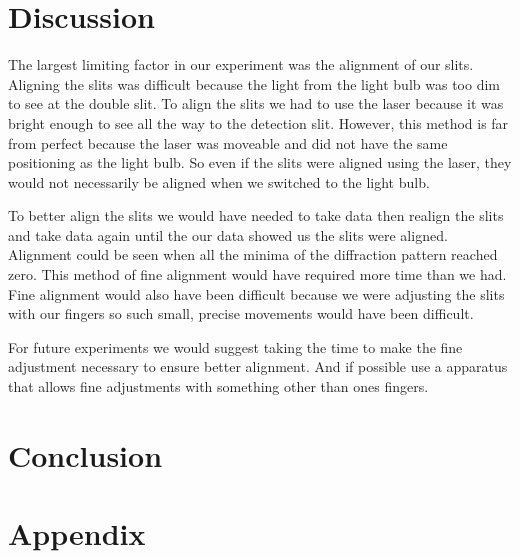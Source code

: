\documentclass[prb,preprint]{revtex4-1}
\begin{document}
\section{Discussion}

The largest limiting factor in our experiment was the alignment of our slits. Aligning the slits was difficult because the light from the light bulb was too dim to see at the double slit. To align the slits we had to use the laser because it was bright enough to see all the way to the detection slit. However, this method is far from perfect because the laser was moveable and did not have the same positioning as the light bulb. So even if the slits were aligned using the laser, they would not necessarily be aligned when we switched to the light bulb.

To better align the slits we would have needed to take data then realign the slits and take data again until the our data showed us the slits were aligned. Alignment could be seen when all the minima of the diffraction pattern reached zero. This method of fine alignment would have required more time than we had. Fine alignment would also have been difficult because we were adjusting the slits with our fingers so such small, precise movements would have been difficult.

For future experiments we would suggest taking the time to make the fine adjustment necessary to ensure better alignment. And if possible use a apparatus that allows fine adjustments with something other than ones fingers.

\section{Conclusion}

\section{Appendix}
\end{document}
